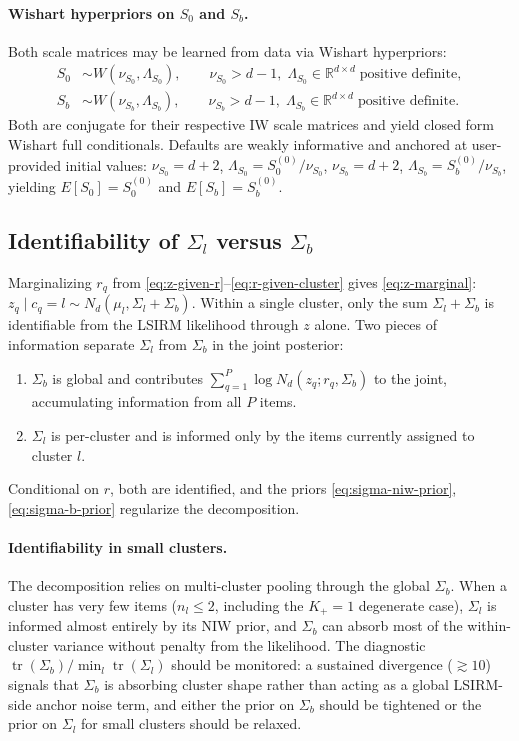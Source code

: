 \documentclass[11pt]{article}
\newcommand{\R}{\mathbb R}
\DeclareMathOperator{\tr}{tr}
\begin{document}
\paragraph{Wishart hyperpriors on $S_0$ and $S_b$.}
Both scale matrices may be learned from data via Wishart hyperpriors:
\begin{align}
    S_0&\sim W(\nu_{S_0},\Lambda_{S_0}),
    \qquad \nu_{S_0}>d-1,\;\Lambda_{S_0}\in\R^{d\times d}\;\text{positive definite},
    \label{eq:S0-hyperprior}\\
    S_b&\sim W(\nu_{S_b},\Lambda_{S_b}),
    \qquad \nu_{S_b}>d-1,\;\Lambda_{S_b}\in\R^{d\times d}\;\text{positive definite}.
    \label{eq:Sb-hyperprior}
\end{align}
Both are conjugate for their respective IW scale matrices and yield closed
form Wishart full conditionals.  Defaults are weakly informative and
anchored at user-provided initial values:
$\nu_{S_0}=d+2$, $\Lambda_{S_0}=S_0^{(0)}/\nu_{S_0}$,
$\nu_{S_b}=d+2$, $\Lambda_{S_b}=S_b^{(0)}/\nu_{S_b}$, yielding
$E[S_0]=S_0^{(0)}$ and $E[S_b]=S_b^{(0)}$.

\subsection{Identifiability of $\Sigma_l$ versus $\Sigma_b$}
\label{sec:identifiability}

Marginalizing $r_q$ from
\eqref{eq:z-given-r}--\eqref{eq:r-given-cluster} gives
\eqref{eq:z-marginal}: $z_q\mid c_q=l\sim N_d(\mu_l,\Sigma_l+\Sigma_b)$.
Within a single cluster, only the sum $\Sigma_l+\Sigma_b$ is identifiable
from the LSIRM likelihood through $z$ alone.  Two pieces of information
separate $\Sigma_l$ from $\Sigma_b$ in the joint posterior:
\begin{enumerate}[leftmargin=1.5em]
    \item $\Sigma_b$ is global and contributes
    $\sum_{q=1}^P\log N_d(z_q;r_q,\Sigma_b)$ to the joint, accumulating
    information from all $P$ items.
    \item $\Sigma_l$ is per-cluster and is informed only by the items
    currently assigned to cluster $l$.
\end{enumerate}
Conditional on $r$, both are identified, and the priors
\eqref{eq:sigma-niw-prior}, \eqref{eq:sigma-b-prior} regularize the
decomposition.

\paragraph{Identifiability in small clusters.}
The decomposition relies on multi-cluster pooling through the global
$\Sigma_b$.  When a cluster has very few items ($n_l\leq 2$, including
the $K_+=1$ degenerate case), $\Sigma_l$ is informed almost entirely by
its NIW prior, and $\Sigma_b$ can absorb most of the within-cluster
variance without penalty from the likelihood.  The diagnostic
$\tr(\Sigma_b)/\min_l\tr(\Sigma_l)$ should be monitored: a sustained
divergence ($\gtrsim 10$) signals that $\Sigma_b$ is absorbing cluster
shape rather than acting as a global LSIRM-side anchor noise term, and
either the prior on $\Sigma_b$ should be tightened or the prior on
$\Sigma_l$ for small clusters should be relaxed.
\end{document}
